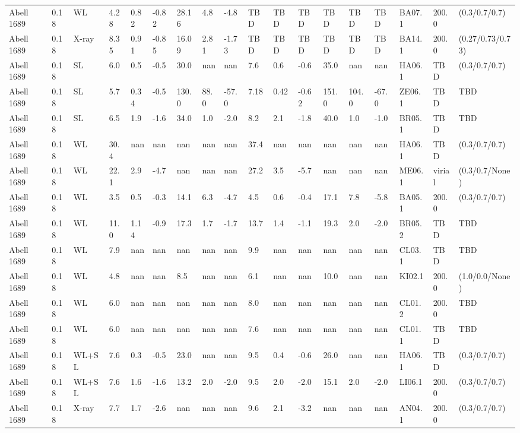 \documentclass{article}
\begin{document}
\begin{center}
\begin{landscape}
\begin{longtable}{llllllllllllllllll}
Abell 1689 & 0.18 & WL & 4.28 & 0.82 & -0.82 & 28.16 & 4.8 & -4.8 & TBD & TBD & TBD & TBD & TBD & TBD & BA07.1 & 200.0 & (0.3/0.7/0.7) \\
Abell 1689 & 0.18 & X-ray & 8.35 & 0.91 & -0.85 & 16.09 & 2.81 & -1.73 & TBD & TBD & TBD & TBD & TBD & TBD & BA14.1 & 200.0 & (0.27/0.73/0.73) \\
Abell 1689 & 0.18 & SL & 6.0 & 0.5 & -0.5 & 30.0 & nan & nan & 7.6 & 0.6 & -0.6 & 35.0 & nan & nan & HA06.1 & TBD & (0.3/0.7/0.7) \\
Abell 1689 & 0.18 & SL & 5.7 & 0.34 & -0.5 & 130.0 & 88.0 & -57.0 & 7.18 & 0.42 & -0.62 & 151.0 & 104.0 & -67.0 & ZE06.1 & TBD & TBD \\
Abell 1689 & 0.18 & SL & 6.5 & 1.9 & -1.6 & 34.0 & 1.0 & -2.0 & 8.2 & 2.1 & -1.8 & 40.0 & 1.0 & -1.0 & BR05.1 & TBD & TBD \\
Abell 1689 & 0.18 & WL & 30.4 & nan & nan & nan & nan & nan & 37.4 & nan & nan & nan & nan & nan & HA06.1 & TBD & (0.3/0.7/0.7) \\
Abell 1689 & 0.18 & WL & 22.1 & 2.9 & -4.7 & nan & nan & nan & 27.2 & 3.5 & -5.7 & nan & nan & nan & ME06.1 & virial & (0.3/0.7/None) \\
Abell 1689 & 0.18 & WL & 3.5 & 0.5 & -0.3 & 14.1 & 6.3 & -4.7 & 4.5 & 0.6 & -0.4 & 17.1 & 7.8 & -5.8 & BA05.1 & 200.0 & (0.3/0.7/0.7) \\
Abell 1689 & 0.18 & WL & 11.0 & 1.14 & -0.9 & 17.3 & 1.7 & -1.7 & 13.7 & 1.4 & -1.1 & 19.3 & 2.0 & -2.0 & BR05.2 & TBD & TBD \\
Abell 1689 & 0.18 & WL & 7.9 & nan & nan & nan & nan & nan & 9.9 & nan & nan & nan & nan & nan & CL03.1 & TBD & TBD \\
Abell 1689 & 0.18 & WL & 4.8 & nan & nan & 8.5 & nan & nan & 6.1 & nan & nan & 10.0 & nan & nan & KI02.1 & 200.0 & (1.0/0.0/None) \\
Abell 1689 & 0.18 & WL & 6.0 & nan & nan & nan & nan & nan & 8.0 & nan & nan & nan & nan & nan & CL01.2 & 200.0 & TBD \\
Abell 1689 & 0.18 & WL & 6.0 & nan & nan & nan & nan & nan & 7.6 & nan & nan & nan & nan & nan & CL01.1 & TBD & TBD \\
Abell 1689 & 0.18 & WL+SL & 7.6 & 0.3 & -0.5 & 23.0 & nan & nan & 9.5 & 0.4 & -0.6 & 26.0 & nan & nan & HA06.1 & TBD & (0.3/0.7/0.7) \\
Abell 1689 & 0.18 & WL+SL & 7.6 & 1.6 & -1.6 & 13.2 & 2.0 & -2.0 & 9.5 & 2.0 & -2.0 & 15.1 & 2.0 & -2.0 & LI06.1 & 200.0 & (0.3/0.7/0.7) \\
Abell 1689 & 0.18 & X-ray & 7.7 & 1.7 & -2.6 & nan & nan & nan & 9.6 & 2.1 & -3.2 & nan & nan & nan & AN04.1 & 200.0 & (0.3/0.7/0.7) \\

\end{longtable}
\end{landscape}
\end{center}
\end{document}

